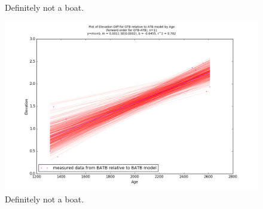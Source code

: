 \begin{figure}[h]
	\caption{Definitely not a boat.}
	\label{fig:data_GTBxATB}
\end{figure}
\newpage

\begin{figure}[h]
	\includegraphics[width=\linewidth]{data/gias/theGIA_GTB_relative_to_ATB.png}
	\caption{Definitely not a boat.}
	\label{fig:gias_GTBxATB}
\end{figure}
\newpage


